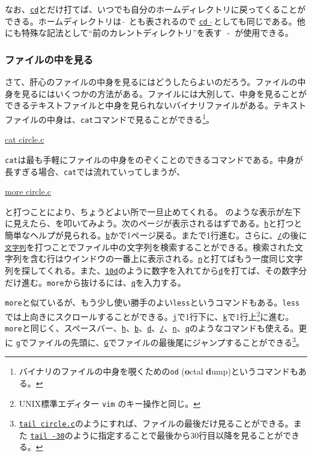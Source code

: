なお、\underline{\texttt{cd}}とだけ打てば、いつでも自分のホームディレクトリに戻ってくることができる。ホームディレクトリは \(\tilde{\ }\) とも表されるので \underline{\texttt{cd \(\tilde{\ }\)}}としても同じである。他にも特殊な記法として``前のカレントディレクトリ''を表す\texttt{ - }が使用できる。

\subsubsection*{ファイルの中を見る}

さて、肝心のファイルの中身を見るにはどうしたらよいのだろう。ファイルの中身を見るにはいくつかの方法がある。ファイルには大別して、中身を見ることができるテキストファイルと中身を見られないバイナリファイルがある。テキストファイルの中身は、\texttt{cat}コマンドで見ることができる\footnote{バイナリのファイルの中身を覗くための\texttt{od} (\textbf{o}ctal \textbf{d}ump)というコマンドもある。}。
\begin{commandline2}
    \prompt \underline{cat circle.c}
\end{commandline2} \noindent
\texttt{cat}は最も手軽にファイルの中身をのぞくことのできるコマンドである。中身が長すぎる場合、\texttt{cat}では流れていってしまうが、
\begin{commandline2}
    \prompt \underline{more circle.c}
\end{commandline2} \noindent
と打つことにより、ちょうどよい所で一旦止めてくれる。 のような表示が左下に見えたら、\spc を叩いてみよう。次のページが表示されるはずである。\underline{\texttt{h}}と打つと簡単なヘルプが見られる。\underline{\texttt{b}}かで1ページ戻る。また\ret で1行進む。さらに、\underline{\texttt{/}}の後に\underline{\texttt{文字列}}を打つことでファイル中の文字列を検索することができる。検索された文字列を含む行はウインドウの一番上に表示される。\underline{\texttt{n}}と打てばもう一度同じ文字列を探してくれる。また、\underline{\texttt{10d}}のように数字を入れてから\underline{\texttt{d}}を打てば、その数字分だけ進む。\texttt{more}から抜けるには、\underline{\texttt{q}}を入力する。

\texttt{more}と似ているが、もう少し使い勝手のよい\texttt{less}\label{sect:less}というコマンドもある。\texttt{less}では上向きにスクロールすることができる。\underline{\texttt{j}}で1行下に、\underline{\texttt{k}}で1行上\footnote{UNIX標準エディター \texttt{vim} のキー操作と同じ。}に進む。\texttt{more}と同じく、スペースバー、\underline{\texttt{h}}、\underline{\texttt{b}}、\underline{\texttt{d}}、\underline{\texttt{/}}、\underline{\texttt{n}}、\underline{\texttt{q}}のようなコマンドも使える。更に \underline{\texttt{g}}でファイルの先頭に、\underline{\texttt{G}}でファイルの最後尾にジャンプすることができる\footnote{\texttt{\underline{tail circle.c}}のようにすれば、ファイルの最後だけ見ることができる。また \underline{\texttt{tail -30}}のように指定することで最後から30行目以降を見ることができる。}。

